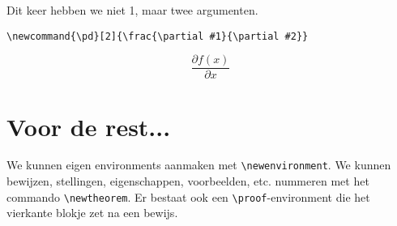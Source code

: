 \documentclass{article}
\begin{document}
	 	Dit keer hebben we niet 1, maar twee argumenten.
	 	
	 	\verb?\newcommand{\pd}[2]{\frac{\partial #1}{\partial #2}}?
	 	
	 	\newcommand{\pd}[2]{\frac{\partial #1}{\partial #2}}
	 	
	 	\[ \pd{f(x)}{x} \]
	 	
	 	\section{Voor de rest...}
	 	
	 	We kunnen eigen environments aanmaken met \verb*|\newenvironment|. We kunnen bewijzen, stellingen, eigenschappen, voorbeelden, etc. nummeren met het commando \verb*|\newtheorem|. Er bestaat ook een \verb*|\proof|-environment die het vierkante blokje zet na een bewijs.
	
\end{document}
